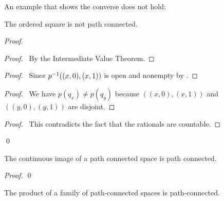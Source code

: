 An example that shows the converse does not hold:
\begin{example}
    The ordered square is not path connected.

    \begin{proof}
        \pf
        \begin{proof}
            \pf\ By the Intermediate Value Theorem.
        \end{proof}
        \begin{proof}
            \pf\ Since ${p}^{-1}((x,0),(x,1))$ is open and nonempty by .
        \end{proof}
        \begin{proof}
            \pf\ We have $p(q_x) \neq p(q_y)$ because $((x,0),(x,1))$ and $((y,0),(y,1))$ are disjoint.
        \end{proof}
        \qedstep
        \begin{proof}
            \pf\ This contradicts the fact that the rationals are countable.
        \end{proof}
        \qed
    \end{proof}
\end{example}

\begin{proposition}
    \label{proposition:path_connected_continuous_image}
    The continuous image of a path connected space is path connected.
\end{proposition}

\begin{proof}
    \pf
    \qed
\end{proof}

\begin{proposition}[AC]
    \label{proposition:product_path_connected}
    The product of a family of path-connected spaces is path-connected.
\end{proposition}

